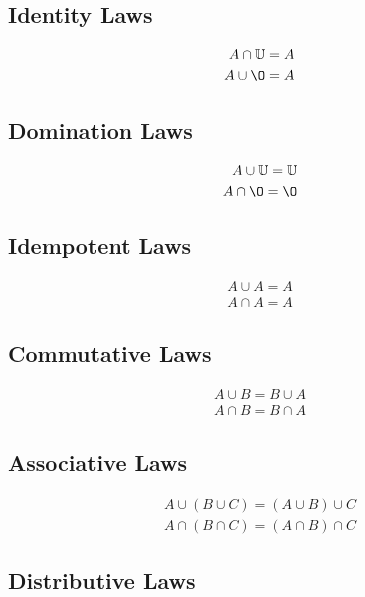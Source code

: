 \documentclass[12pt letter]{report}
\begin{document}
\subsection{Identity Laws}

\begin{align*}
	A \cap   \mathbb{U} = A \\
	A \cup  \O = A
\end{align*}

\subsection{Domination Laws}

\begin{align*}
	A \cup \mathbb{U} = \mathbb{U} \\
	A \cap \O = \O
\end{align*}

\subsection{Idempotent Laws}

\begin{align*}
	A \cup A = A \\
	A \cap A = A
\end{align*}

\subsection{Commutative Laws}

\begin{align*}
	A \cup B = B \cup A \\
	A \cap B = B \cap A
\end{align*}

\subsection{Associative Laws}

\begin{align*}
	A \cup \left( B \cup  C \right)  = \left( A \cup B \right)  \cup C \\
	A \cap \left( B \cap C  \right)  = \left( A \cap B \right)  \cap C
\end{align*}

\subsection{Distributive Laws}
\end{document}
